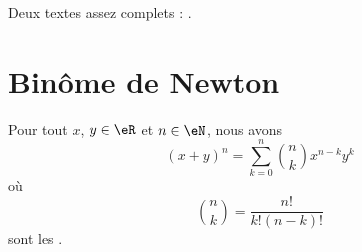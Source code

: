 
Deux textes assez complets : \cite{MesIntProbb,MathAgreg}.

					\section{Binôme de Newton}

\begin{proposition}     \label{PropBinomFExOiL}
Pour tout $x$, $y\in\eR$ et $n\in\eN$, nous avons
\begin{equation}		\label{EqNewtonB}
	(x+y)^n=\sum_{k=0}^n{n\choose k}x^{n-k}y^k
\end{equation}
où
\begin{equation}
	{n\choose k}=\frac{ n! }{ k!(n-k)! }
\end{equation}
sont les .
\end{proposition}

